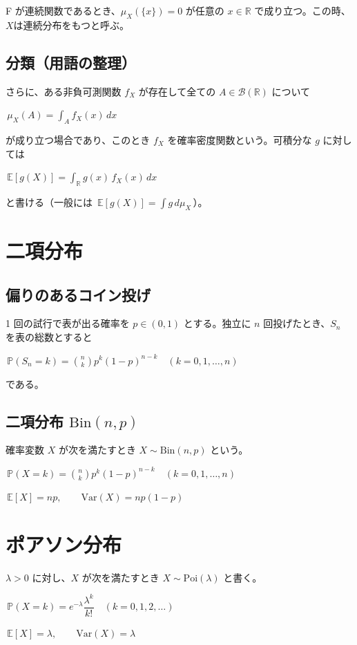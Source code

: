 \documentclass[uplatex,dvipdfmx,11pt,a4paper,openany]{bxjsbook}
\begin{document}
F が連続関数であるとき、$\mu_X(\{x\})=0$ が任意の $x\in\mathbb{R}$ で成り立つ。この時、$X$は連続分布をもつと呼ぶ。

\subsection{分類（用語の整理）}
さらに、ある非負可測関数 $f_X$ が存在して全ての $A\in\mathcal{B}(\mathbb{R})$ について

$\,\mu_X(A)=\displaystyle\int_A f_X(x)\,dx\,$

が成り立つ場合であり、このとき $f_X$ を確率密度関数という。可積分な $g$ に対しては

$\,\mathbb{E}[g(X)]=\displaystyle\int_{\mathbb{R}} g(x)\,f_X(x)\,dx\,$

と書ける（一般には $\,\mathbb{E}[g(X)]=\int g\,d\mu_X\,$）。

\section{二項分布}
\subsection{偏りのあるコイン投げ}
1 回の試行で表が出る確率を $p\in(0,1)$ とする。独立に $n$ 回投げたとき、$S_n$ を表の総数とすると

$\,\mathbb{P}(S_n=k)=\binom{n}{k}p^k(1-p)^{n-k}\quad(k=0,1,\dots,n)\,$

である。

\subsection{二項分布 $\mathrm{Bin}(n,p)$}
確率変数 $X$ が次を満たすとき $X\sim\mathrm{Bin}(n,p)$ という。

$\,\mathbb{P}(X=k)=\binom{n}{k}p^k(1-p)^{n-k}\quad(k=0,1,\dots,n)\,$

$\,\mathbb{E}[X]=np,\qquad \mathrm{Var}(X)=np(1-p)\,$

\section{ポアソン分布}
$\lambda>0$ に対し、$X$ が次を満たすとき $X\sim\mathrm{Poi}(\lambda)$ と書く。

$\,\mathbb{P}(X=k)=e^{-\lambda}\dfrac{\lambda^k}{k!}\quad(k=0,1,2,\dots)\,$

$\,\mathbb{E}[X]=\lambda,\qquad \mathrm{Var}(X)=\lambda\,$
\end{document}
